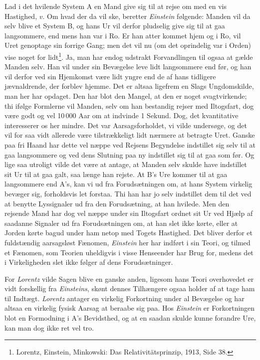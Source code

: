 \documentclass[12pt,a4paper]{article}
\newcommand{\opage}[1]{\marginnote{\footnotesize\textit{[#1]}}}
\begin{document}
Lad i det hvilende System A en Mand give sig til at rejse om med en vis
Hastighed, $v$. Om hvad der da vil ske, beretter \emph{Einstein} følgende:
Manden vil da selv blive et System B, og hans Ur vil derfor pludselig give sig
til at gaa langsommere, end mens han var i Ro. Er han atter kommet hjem og i
Ro, vil Uret genoptage sin forrige Gang; men det vil nu (om det oprindelig var
i Orden) vise noget for lidt\footnote{Lorentz, Einstein, Minkowski: Das
Relativitätsprinzip, 1913, Side 38.}. Ja, man har endog udstrakt Forvandlingen
til ogsaa at gælde Manden selv. Han vil under sin Bevægelse leve lidt
langsommere end før, og han vil derfor ved sin Hjemkomst være lidt yngre end de
af hans tidligere jævnaldrende, der forblev hjemme. Det er altsaa ligefrem en
Slags Ungdomskilde, man her har opdaget. Den har blot den Mangel, at den er
noget svagtvirkende; thi ifølge Formlerne vil Manden, selv om han bestandig
rejser med Iltogsfart, dog være godt og vel 10\,000 Aar om at indvinde 1
Sekund. Dog, det kvantitative interesserer os her mindre. Det var
Aarsagsforholdet, vi vilde undersøge, og det vil for saa vidt allerede være
tilstrækkeligt lidt nærmere at betragte Uret. Ganske paa fri Haand har dette
vel næppe ved Rejsens Begyndelse indstillet sig selv til at gaa langsommere og
ved dens Slutning paa ny indstillet sig til at gaa som før. Og lige saa
utroligt vilde det være at antage, at Manden selv skulde have indstillet sit Ur
til at gaa galt, saa længe han rejste. At B's Ure kommer til at gaa langsommere
end A's, kan vi ud fra Forudsætningen om, at hans System virkelig bevæger sig,
forholdsvis let forstaa. Thi han har jo selv indstillet dem til det ved at
benytte Lyssignaler ud fra den Forudsætning, at han hvilede. Men den rejsende
Mand har dog vel næppe under sin Iltogsfart
\guillemotleft ordnet\guillemotright{} sit Ur ved Hjælp af saadanne Signaler ud
fra Forudsætningen om, at han slet ikke kørte, eller at Jorden kørte bagud
under ham netop med Togets Hastighed. Det bliver derfor et fuldstændig
aarsagsløst Fænomen, \emph{Einstein} her har indført i sin Teori, og tilmed et
Fænomen, som Teorien uheldigvis i visse Henseender har
\opage{29} Brug for, medens det i Virkeligheden slet ikke følger af dens Forudsætninger.

For \emph{Lorentz} vilde Sagen blive en ganske anden, ligesom hans Teori
overhovedet er vidt forskellig fra \emph{Einsteins}, skønt dennes Tilhængere
ogsaa holder af at tage ham til Indtægt. \emph{Lorentz} antager en virkelig
Forkortning under al Bevægelse og har altsaa en virkelig fysisk Aarsag at
beraabe sig paa. Hos \emph{Einstein} er Forkortningen blot en Formodning i A's
Bevidsthed, og at en saadan skulde kunne forandre Ure, kan man dog ikke ret vel
tro.
\end{document}
